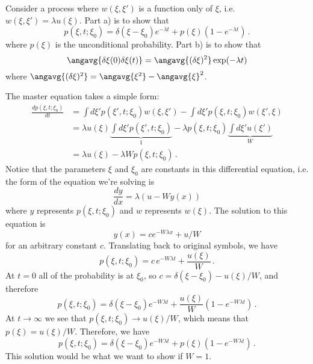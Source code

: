 Consider a process where $w(\xi, \xi')$ is a function only of $\xi$, i.e. $w(\xi, \xi') = \lambda u(\xi)$.
Part a) is to show that
\begin{equation*}
  p(\xi, t; \xi_0)
  = \delta(\xi - \xi_0) e^{-\lambda t} + p(\xi) \left( 1 - e^{-\lambda t} \right)
  \, .
\end{equation*}
where $p(\xi)$ is the unconditional probability.
Part b) is to show that
\begin{equation*}
  \angavg{\delta \xi(0) \delta \xi(t)} = \angavg{(\delta \xi)^2} \exp(- \lambda t)
\end{equation*}
where $\angavg{(\delta \xi)^2} = \angavg{\xi^2} - \angavg{\xi}^2$.


The master equation takes a simple form:
\begin{align*}
	\frac{dp(\xi, t; \xi_0)}{dt}
	&= \int d\xi' p(\xi', t; \xi_0) w(\xi, \xi') - \int d\xi' p(\xi, t; \xi_0) w(\xi', \xi) \\
	&= \lambda u(\xi) \underbrace{\int d\xi' p(\xi', t; \xi_0)}_1 - \lambda p(\xi, t; \xi_0) \underbrace{\int d\xi' u(\xi')}_W \\
	&= \lambda u(\xi) - \lambda W p(\xi, t; \xi_0)
	\, .
\end{align*}
Notice that the parameters $\xi$ and $\xi_0$ are constants in this differential equation, i.e. the form of the equation we're solving is
\begin{equation*}
	\frac{dy}{dx} = \lambda \left( u - W y(x) \right)
\end{equation*}
where $y$ represents $p(\xi, t; \xi_0)$ and $w$ represents $w(\xi)$.
The solution to this equation is
\begin{equation*}
	y(x) = c e^{-W \lambda x} + u/W
\end{equation*}
for an arbitrary constant $c$.
Translating back to original symbols, we have
\begin{equation*}
	p(\xi, t; \xi_0) = c \, e^{-W \lambda t} + \frac{u(\xi)}{W} \, .
\end{equation*}
At $t=0$ all of the probability is at $\xi_0$, so $c = \delta(\xi - \xi_0) - u(\xi) / W$, and therefore
\begin{equation*}
	p(\xi, t; \xi_0)
	= \delta(\xi - \xi_0) e^{-W \lambda t} + \frac{u(\xi)}{W} \left( 1 - e^{-W \lambda t} \right)
	\, .
\end{equation*}
At $t \rightarrow \infty$ we see that $p(\xi, t; \xi_0) \rightarrow u(\xi)/W$, which means that $p(\xi) = u(\xi)/W$.
Therefore, we have
\begin{equation*}
	p(\xi, t; \xi_0) = \delta(\xi - \xi_0) e^{-W \lambda t} + p(\xi) \left( 1 - e^{-W \lambda t} \right)
	\, .
\end{equation*}
This solution would be what we want to show if $W = 1$.

